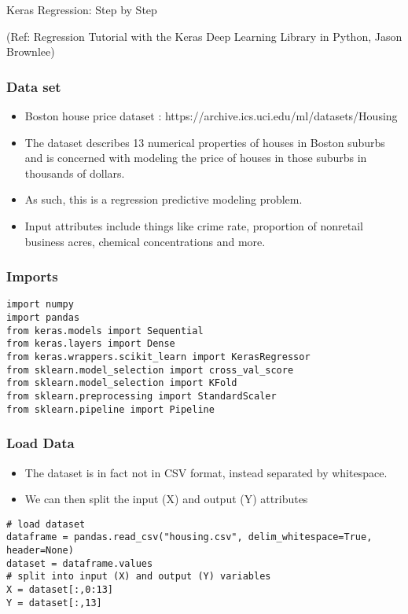 \begin{frame}
  \begin{center}
    {\Large Keras Regression: Step by Step}
    
    \tiny{(Ref:  Regression Tutorial with the Keras Deep Learning Library in Python, Jason Brownlee)}
  \end{center}
\end{frame}


\begin{frame}[fragile] \frametitle{Data set}
 \begin{itemize}
 \item   Boston house price dataset : https://archive.ics.uci.edu/ml/datasets/Housing
 \item  The dataset describes 13 numerical properties of houses in Boston suburbs and is concerned with modeling the price of houses in those suburbs in thousands of dollars. 
 \item As such, this is a regression predictive modeling problem. 
 \item Input attributes include things like crime rate, proportion of nonretail business acres, chemical concentrations and more.
\end{itemize}
\end{frame}

\begin{frame}[fragile] \frametitle{Imports}
\begin{lstlisting}
import numpy
import pandas
from keras.models import Sequential
from keras.layers import Dense
from keras.wrappers.scikit_learn import KerasRegressor
from sklearn.model_selection import cross_val_score
from sklearn.model_selection import KFold
from sklearn.preprocessing import StandardScaler
from sklearn.pipeline import Pipeline
\end{lstlisting}
\end{frame}

\begin{frame}[fragile] \frametitle{Load Data}
 \begin{itemize}
 \item The dataset is in fact not in CSV format, instead separated by whitespace. 
 \item We can then split the input (X) and output (Y) attributes
 \end{itemize}
\begin{lstlisting}
# load dataset
dataframe = pandas.read_csv("housing.csv", delim_whitespace=True, header=None)
dataset = dataframe.values
# split into input (X) and output (Y) variables
X = dataset[:,0:13]
Y = dataset[:,13]
\end{lstlisting}
\end{frame}


